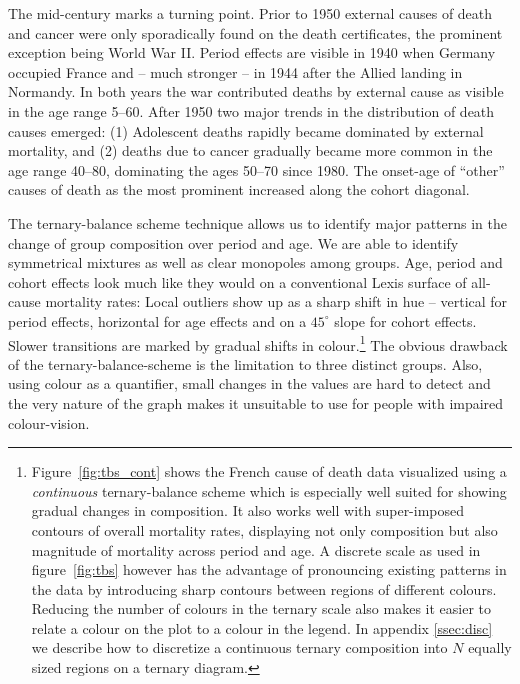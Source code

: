 \documentclass[parskip=half]{scrartcl}
\begin{document}
The mid-century marks a turning point. Prior to 1950 external causes of death and cancer were only sporadically found on the death certificates, the prominent exception being World War II. Period effects are visible in 1940 when Germany occupied France and -- much stronger -- in 1944 after the Allied landing in Normandy. In both years the war contributed deaths by external cause as visible in the age range 5--60. After 1950 two major trends in the distribution of death causes emerged:
  (1) Adolescent deaths rapidly became dominated by external mortality, and
  (2) deaths due to cancer gradually became more common in the age range 40--80, dominating the ages 50--70 since 1980. The onset-age of \enquote{other} causes of death as the most prominent increased along the cohort diagonal.

The ternary-balance scheme technique allows us to identify major patterns in the change of group composition over period and age. We are able to identify symmetrical mixtures as well as clear monopoles among groups. Age, period and cohort effects look much like they would on a conventional Lexis surface of all-cause mortality rates: Local outliers show up as a sharp shift in hue -- vertical for period effects, horizontal for age effects and on a $45^{\circ}$ slope for cohort effects. Slower transitions are marked by gradual shifts in colour.\footnote{
  Figure~\ref{fig:tbs_cont} shows the French cause of death data visualized using a \emph{continuous} ternary-balance scheme which is especially well suited for showing gradual changes in composition. It also works well with super-imposed contours of overall mortality rates, displaying not only composition but also magnitude of mortality across period and age. A discrete scale as used in figure~\ref{fig:tbs} however has the advantage of pronouncing existing patterns in the data by introducing sharp contours between regions of different colours. Reducing the number of colours in the ternary scale also makes it easier to relate a colour on the plot to a colour in the legend. In appendix \ref{ssec:disc} we describe how to discretize a continuous ternary composition into $N$ equally sized regions on a ternary diagram.
}
The obvious drawback of the ternary-balance-scheme is the limitation to three distinct groups. Also, using colour as a quantifier, small changes in the values are hard to detect and the very nature of the graph makes it unsuitable to use for people with impaired colour-vision.

\clearpage
\end{document}
